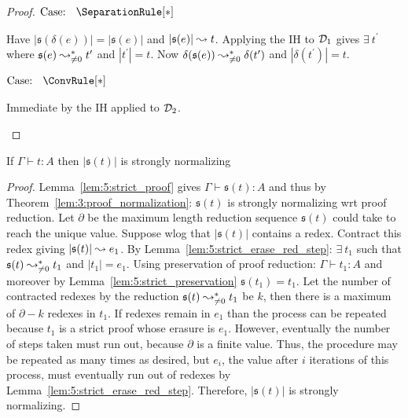 \begin{proof}
    $\text{Case: }\begin{array}{c} \SeparationRule[*] \end{array}$
    \begin{proofcase}
        Have $|\mathfrak{s}(\delta(e))| = |\mathfrak{s}(e)|$ and $|\mathfrak{s}(e)| \leadsto t$.
        Applying the IH to $\mathcal{D}_{1}$ gives $\exists\ t^\prime$ where $\mathfrak{s}(e) \leadsto^*_{\neq 0} t^\prime$ and $|t^\prime| = t$.
        Now $\delta(\mathfrak{s}(e)) \leadsto^*_{\neq 0} \delta(t^\prime)$ and $|\delta(t^\prime)| = t$.
    \end{proofcase}

    $\text{Case: }\begin{array}{c} \ConvRule[*] \end{array}$
    \begin{proofcase}
        Immediate by the IH applied to $\mathcal{D}_{2}$.
    \end{proofcase}

\end{proof}

\begin{theorem}
    \label{lem:5:strict_object_sn}
    If $\Gamma \vdash t : A$ then $|\mathfrak{s}(t)|$ is strongly normalizing
\end{theorem}
\begin{proof}
    Lemma~\ref{lem:5:strict_proof} gives $\Gamma \vdash \mathfrak{s}(t) : A$ and thus by Theorem~\ref{lem:3:proof_normalization}: $\mathfrak{s}(t)$ is strongly normalizing wrt proof reduction.
    Let $\partial$ be the maximum length reduction sequence $\mathfrak{s}(t)$ could take to reach the unique value.
    Suppose wlog that $|\mathfrak{s}(t)|$ contains a redex.
    Contract this redex giving $|\mathfrak{s}(t)| \leadsto e_1$.
    By Lemma~\ref{lem:5:strict_erase_red_step}: $\exists\ t_1$ such that $\mathfrak{s}(t) \leadsto^*_{\neq 0} t_1$ and $|t_1| = e_1$.
    Using preservation of proof reduction: $\Gamma \vdash t_1 : A$ and moreover by Lemma~\ref{lem:5:strict_preservation} $\mathfrak{s}(t_1) = t_1$.
    Let the number of contracted redexes by the reduction $\mathfrak{s}(t) \leadsto^*_{\neq 0} t_1$ be $k$, then there is a maximum of $\partial - k$ redexes in $t_1$.
    If redexes remain in $e_1$ than the process can be repeated because $t_1$ is a strict proof whose erasure is $e_1$.
    However, eventually the number of steps taken must run out, because $\partial$ is a finite value.
    Thus, the procedure may be repeated as many times as desired, but $e_i$, the value after $i$ iterations of this process, must eventually run out of redexes by Lemma~\ref{lem:5:strict_erase_red_step}.
    Therefore, $|\mathfrak{s}(t)|$ is strongly normalizing.
\end{proof}

